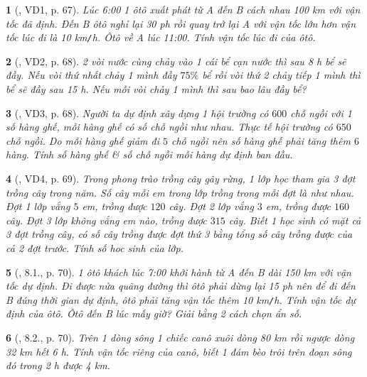 \documentclass{article}
\newtheorem{baitoan}{}
\begin{document}
\begin{baitoan}[\cite{Binh_boi_duong_Toan_9_tap_2}, VD1, p. 67]
	Lúc {\rm6:00} 1 ôtô xuất phát từ A đến B cách nhau {\rm100 km} với vận tốc đã định. Đến B ôtô nghỉ lại {\rm30 ph} rồi quay trở lại A với vận tốc lớn hơn vận tốc lúc đi là {\rm10 km{\tt/}h}. Ôtô về A lúc {\rm11:00}. Tính vận tốc lúc đi của ôtô.
\end{baitoan}

\begin{baitoan}[\cite{Binh_boi_duong_Toan_9_tap_2}, VD2, p. 68]
	2 vòi nước cùng chảy vào 1 cái bể cạn nước thì sau {\rm8 h} bể sẽ đầy. Nếu vòi thứ nhất chảy 1 mình đầy $75\%$ bể rồi vòi thứ 2 chảy tiếp 1 mình thì bể sẽ đầy sau {\rm15 h}. Nếu mỗi vòi chảy 1 mình thì sau bao lâu đầy bể?
\end{baitoan}

\begin{baitoan}[\cite{Binh_boi_duong_Toan_9_tap_2}, VD3, p. 68]
	Người ta dự định xây dựng 1 hội trường có $600$ chỗ ngồi với 1 số hàng ghế, mỗi hàng ghế có số chỗ ngồi như nhau. Thực tế hội trường có $650$ chỗ ngồi. Do mỗi hàng ghế giảm đi $5$ chỗ ngồi nên số hàng ghế phải tăng thêm $6$ hàng. Tính số hàng ghế \& số chỗ ngồi mỗi hàng dự định ban đầu.
\end{baitoan}

\begin{baitoan}[\cite{Binh_boi_duong_Toan_9_tap_2}, VD4, p. 69]
	Trong phong trào trồng cây gây rừng, 1 lớp học tham gia 3 đợt trồng cây trong năm. Số cây mỗi em trong lớp trồng trong mỗi đợt là như nhau. Đợt 1 lớp vắng $5$ em, trồng được $120$ cây. Đợt 2 lớp vắng $3$ em, trồng được $160$ cây. Đợt 3 lớp không vắng em nào, trồng được $315$ cây. Biết 1 học sinh có mặt cả 3 đợt trồng cây, có số cây trồng được đợt thứ 3 bằng tổng số cây trồng được của cả 2 đợt trước. Tính số hoc sinh của lớp.
\end{baitoan}

\begin{baitoan}[\cite{Binh_boi_duong_Toan_9_tap_2}, 8.1., p. 70]
	1 ôtô khách lúc {\rm7:00} khởi hành từ A đến B dài {\rm150 km} với vận tốc dự định. Đi được nửa quãng đường thì ôtô phải dừng lại {\rm15 ph} nên để đi đến B đúng thời gian dự định, ôtô phải tăng vận tốc thêm {\rm10 km{\tt/}h}. Tính vận tốc dự định của ôtô. Ôtô đến B lúc mấy giờ? Giải bằng 2 cách chọn ẩn số.
\end{baitoan}

\begin{baitoan}[\cite{Binh_boi_duong_Toan_9_tap_2}, 8.2., p. 70]
	Trên 1 dòng sông 1 chiếc canô xuôi dòng {\rm80 km} rồi ngược dòng {\rm32 km} hết {\rm6 h}. Tính vận tốc riêng của canô, biết 1 đám bèo trôi trên đoạn sông đó trong {\rm2 h} được {\rm4 km}.
\end{baitoan}
\end{document}
